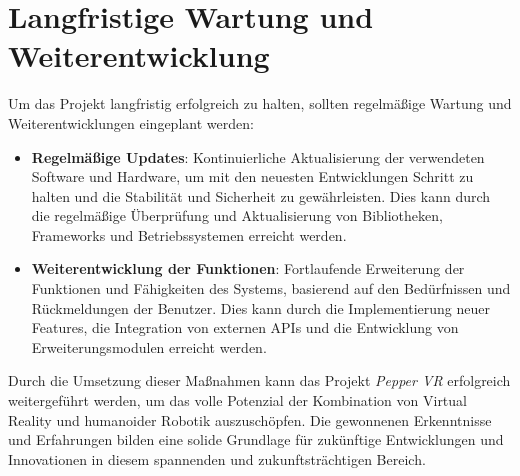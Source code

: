 \section{Langfristige Wartung und Weiterentwicklung}
Um das Projekt langfristig erfolgreich zu halten, sollten regelmäßige Wartung und Weiterentwicklungen eingeplant werden:
\begin{itemize}
    \item \textbf{Regelmäßige Updates}: Kontinuierliche Aktualisierung der verwendeten Software und Hardware, um mit den neuesten Entwicklungen Schritt zu halten und die Stabilität und Sicherheit zu gewährleisten. Dies kann durch die regelmäßige Überprüfung und Aktualisierung von Bibliotheken, Frameworks und Betriebssystemen erreicht werden.
    \item \textbf{Weiterentwicklung der Funktionen}: Fortlaufende Erweiterung der Funktionen und Fähigkeiten des Systems, basierend auf den Bedürfnissen und Rückmeldungen der Benutzer. Dies kann durch die Implementierung neuer Features, die Integration von externen APIs und die Entwicklung von Erweiterungsmodulen erreicht werden.
\end{itemize}

\noindent
Durch die Umsetzung dieser Maßnahmen kann das Projekt \textit{Pepper VR} erfolgreich weitergeführt werden, um das volle Potenzial der Kombination von Virtual Reality und humanoider Robotik auszuschöpfen. Die gewonnenen Erkenntnisse und Erfahrungen bilden eine solide Grundlage für zukünftige Entwicklungen und Innovationen in diesem spannenden und zukunftsträchtigen Bereich.
